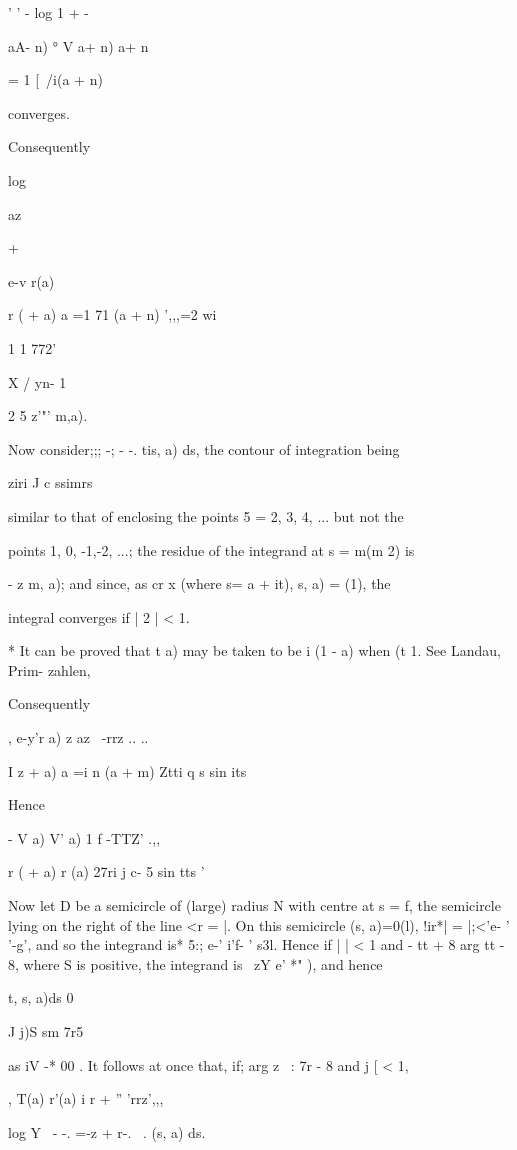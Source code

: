{{' ' - log 1 + -

 aA- n) ° V a+ n) a+ n

= 1 [\ /i(a + n)

converges.

Consequently

log

az

+

e-v r(a)

r ( + a) a =1 71 (a + n) ',,,=2 wi

1 1 772'

X / yn- 1

2 5 z'"' m,a).

Now consider;;; -; - -. tis, a) ds, the contour of integration being

ziri J c ssimrs

similar to that of enclosing the points 5 = 2, 3, 4, ... but
not the

points 1, 0, -1,-2, ...; the residue of the integrand at s = m(m 2) is

- z m, a); and since, as cr x (where s= a + it), s, a) = (1), the

integral converges if | 2 | < 1.

* It can be proved that t a) may be taken to be i (1 - a) when (t 1.
See Landau, Prim- zahlen, %

%
%

Consequently

, e-y'r a) z az \ -rrz .. ..

I z + a) a =i n (a + m) Ztti q s sin its

Hence

- V a) V' a) 1 f -TTZ' .,,

  r ( + a) r (a) 27ri j c- 5 sin tts '

Now let D be a semicircle of (large) radius N with centre at s = f,
the semicircle lying on the right of the line <r = |. On this
semicircle (s, a)=0(l), !ir*| = |;<'e- ' '-g', and so the integrand
is* 5:; e-' i'f- ' s3l. Hence if | | < 1 and - tt + 8 arg tt - 8,
where S is positive, the integrand is \ zY e' *" ), and hence

t, s, a)ds 0

J j)S sm 7r5

as iV -* 00 . It follows at once that, if; arg z \ : 7r - 8 and j [ <
1,

, T(a) r'(a) i r + '' 'rrz',,,

log Y ~- -. =-z + r-. ~. (s, a) ds.

}}
